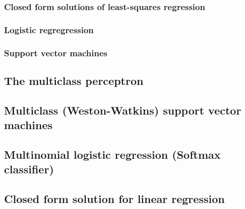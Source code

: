 \subsubsection{Closed form solutions of least-squares regression}

\subsubsection{Logistic regregression}

\subsubsection{Support vector machines}

\subsection{The multiclass perceptron}

\subsection{Multiclass (Weston-Watkins) support vector machines}

\subsection{Multinomial logistic regression (Softmax classifier)}

\subsection{Closed form solution for linear regression}


